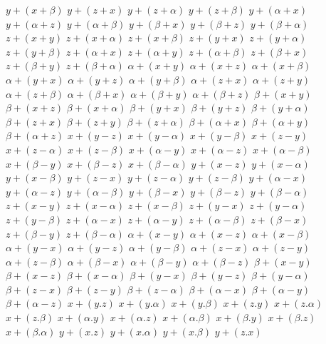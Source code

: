 $ y + (x + \beta) $
$ y + (z + x) $
$ y + (z + \alpha) $
$ y + (z + \beta) $
$ y + (\alpha + x) $
$ y + (\alpha + z) $
$ y + (\alpha + \beta) $
$ y + (\beta + x) $
$ y + (\beta + z) $
$ y + (\beta + \alpha) $
$ z + (x + y) $
$ z + (x + \alpha) $
$ z + (x + \beta) $
$ z + (y + x) $
$ z + (y + \alpha) $
$ z + (y + \beta) $
$ z + (\alpha + x) $
$ z + (\alpha + y) $
$ z + (\alpha + \beta) $
$ z + (\beta + x) $
$ z + (\beta + y) $
$ z + (\beta + \alpha) $
$ \alpha + (x + y) $
$ \alpha + (x + z) $
$ \alpha + (x + \beta) $
$ \alpha + (y + x) $
$ \alpha + (y + z) $
$ \alpha + (y + \beta) $
$ \alpha + (z + x) $
$ \alpha + (z + y) $
$ \alpha + (z + \beta) $
$ \alpha + (\beta + x) $
$ \alpha + (\beta + y) $
$ \alpha + (\beta + z) $
$ \beta + (x + y) $
$ \beta + (x + z) $
$ \beta + (x + \alpha) $
$ \beta + (y + x) $
$ \beta + (y + z) $
$ \beta + (y + \alpha) $
$ \beta + (z + x) $
$ \beta + (z + y) $
$ \beta + (z + \alpha) $
$ \beta + (\alpha + x) $
$ \beta + (\alpha + y) $
$ \beta + (\alpha + z) $
$ x + (y - z) $
$ x + (y - \alpha) $
$ x + (y - \beta) $
$ x + (z - y) $
$ x + (z - \alpha) $
$ x + (z - \beta) $
$ x + (\alpha - y) $
$ x + (\alpha - z) $
$ x + (\alpha - \beta) $
$ x + (\beta - y) $
$ x + (\beta - z) $
$ x + (\beta - \alpha) $
$ y + (x - z) $
$ y + (x - \alpha) $
$ y + (x - \beta) $
$ y + (z - x) $
$ y + (z - \alpha) $
$ y + (z - \beta) $
$ y + (\alpha - x) $
$ y + (\alpha - z) $
$ y + (\alpha - \beta) $
$ y + (\beta - x) $
$ y + (\beta - z) $
$ y + (\beta - \alpha) $
$ z + (x - y) $
$ z + (x - \alpha) $
$ z + (x - \beta) $
$ z + (y - x) $
$ z + (y - \alpha) $
$ z + (y - \beta) $
$ z + (\alpha - x) $
$ z + (\alpha - y) $
$ z + (\alpha - \beta) $
$ z + (\beta - x) $
$ z + (\beta - y) $
$ z + (\beta - \alpha) $
$ \alpha + (x - y) $
$ \alpha + (x - z) $
$ \alpha + (x - \beta) $
$ \alpha + (y - x) $
$ \alpha + (y - z) $
$ \alpha + (y - \beta) $
$ \alpha + (z - x) $
$ \alpha + (z - y) $
$ \alpha + (z - \beta) $
$ \alpha + (\beta - x) $
$ \alpha + (\beta - y) $
$ \alpha + (\beta - z) $
$ \beta + (x - y) $
$ \beta + (x - z) $
$ \beta + (x - \alpha) $
$ \beta + (y - x) $
$ \beta + (y - z) $
$ \beta + (y - \alpha) $
$ \beta + (z - x) $
$ \beta + (z - y) $
$ \beta + (z - \alpha) $
$ \beta + (\alpha - x) $
$ \beta + (\alpha - y) $
$ \beta + (\alpha - z) $
$ x + (y . z) $
$ x + (y . \alpha) $
$ x + (y . \beta) $
$ x + (z . y) $
$ x + (z . \alpha) $
$ x + (z . \beta) $
$ x + (\alpha . y) $
$ x + (\alpha . z) $
$ x + (\alpha . \beta) $
$ x + (\beta . y) $
$ x + (\beta . z) $
$ x + (\beta . \alpha) $
$ y + (x . z) $
$ y + (x . \alpha) $
$ y + (x . \beta) $
$ y + (z . x) $
